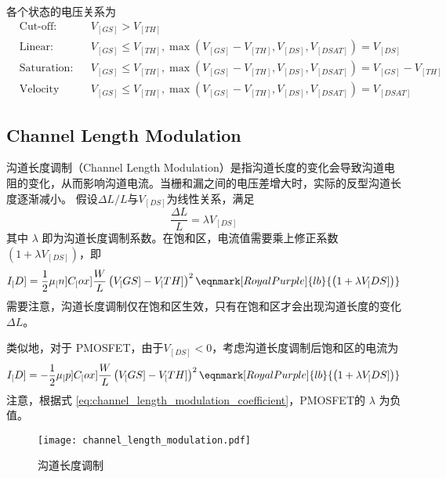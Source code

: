 各个状态的电压关系为
\begin{equation}
    \begin{aligned}
        & \text{Cut-off:} && V_[GS] > V_[TH] \\
        & \text{Linear:} && V_[GS] \leqslant V_[TH], \max \left(V_[GS] - V_[TH], V_[DS], V_[DSAT]\right) = V_[DS] \\
        & \text{Saturation:} && V_[GS] \leqslant V_[TH], \max \left(V_[GS] - V_[TH], V_[DS], V_[DSAT]\right) = V_[GS] - V_[TH] \\
        & \text{Velocity Saturation:} && V_[GS] \leqslant V_[TH], \max \left(V_[GS] - V_[TH], V_[DS], V_[DSAT]\right) = V_[DSAT]
    \end{aligned}
\end{equation}

\subsection{Channel Length Modulation}
沟道长度调制（Channel Length Modulation）是指沟道长度的变化会导致沟道电阻的变化，从而影响沟道电流。当栅和漏之间的电压差增大时，实际的反型沟道长度逐渐减小。
假设$\Delta L / L$与$V_[DS]$为线性关系，满足
\begin{equation}
    \frac{\Delta L}{L} = \lambda V_[DS]
    \label{eq:channel_length_modulation_coefficient}
\end{equation}
其中 $\lambda$ 即为沟道长度调制系数。在饱和区，电流值需要乘上修正系数 $\left(1 + \lambda V_[DS]\right)$，即
\begin{equation}
    I_[D] = \frac{1}{2} \mu_[n] C_[ox] \frac{W}{L} \left( V_[GS] - V_[TH] \right)^2 \eqnmark[RoyalPurple]{lb}{\left( 1 + \lambda V_[DS] \right)}
\end{equation}
需要注意，沟道长度调制仅在饱和区生效，只有在饱和区才会出现沟道长度的变化$\Delta L$。

类似地，对于 PMOSFET，由于$V_[DS]<0$，考虑沟道长度调制后饱和区的电流为
\begin{equation}
    I_[D] = -\frac{1}{2} \mu_[p] C_[ox] \frac{W}{L} \left( V_[GS] - V_[TH] \right)^2 \eqnmark[RoyalPurple]{lb}{\left( 1 + \lambda V_[DS] \right)}
\end{equation}
注意，根据式 \ref{eq:channel_length_modulation_coefficient}，PMOSFET的 $\lambda$ 为负值。

\begin{figure}[!hbt]
    \centering
    \texttt{[image: channel\_length\_modulation.pdf]}
    \caption{沟道长度调制\cite{NeamenSemiconductor}}
    \label{fig:channel_length_modulation}
\end{figure}

